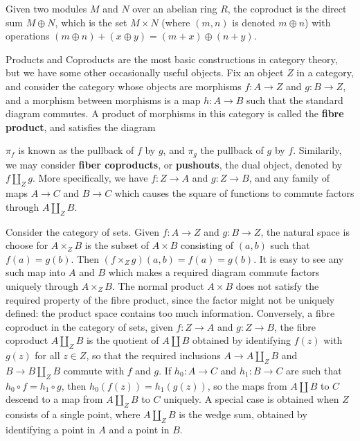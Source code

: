 \begin{example}
    Given two modules $M$ and $N$ over an abelian ring $R$, the coproduct is the direct sum $M \oplus N$, which is the set $M \times N$ (where $(m,n)$ is denoted $m \oplus n$) with operations $(m \oplus n) + (x \oplus y) = (m + x) \oplus (n + y)$.
\end{example}

Products and Coproducts are the most basic constructions in category theory, but we have some other occasionally useful objects. Fix an object $Z$ in a category, and consider the category whose objects are morphisms $f: A \to Z$ and $g: B \to Z$, and a morphism between morphisms is a map $h: A \to B$ such that the standard diagram commutes. A product of morphisms in this category is called the {\bf fibre product}, and satisfies the diagram
%
\begin{center}
\end{center}
%
$\pi_f$ is known as the pullback of $f$ by $g$, and $\pi_g$ the pullback of $g$ by $f$. Similarily, we may consider {\bf fiber coproducts}, or {\bf pushouts}, the dual object, denoted by $f \coprod_Z g$. More specifically, we have $f: Z \to A$ and $g: Z \to B$, and any family of maps $A \to C$ and $B \to C$ which causes the square of functions to commute factors through $A \coprod_Z B$.

\begin{example}
    Consider the category of sets. Given $f: A \to Z$ and $g: B \to Z$, the natural space is choose for $A \times_Z B$ is the subset of $A \times B$ consisting of $(a,b)$ such that $f(a) = g(b)$. Then $(f \times_Z g)(a,b) = f(a) = g(b)$. It is easy to see any such map into $A$ and $B$ which makes a required diagram commute factors uniquely through $A \times_Z B$. The normal product $A \times B$ does not satisfy the required property of the fibre product, since the factor might not be uniquely defined: the product space contains too much information. Conversely, a fibre coproduct in the category of sets, given $f: Z \to A$ and $g: Z \to B$, the fibre coproduct $A \coprod_Z B$ is the quotient of $A \coprod B$ obtained by identifying $f(z)$ with $g(z)$ for all $z \in Z$, so that the required inclusions $A \to A \coprod_Z B$ and $B \to B \coprod_Z B$ commute with $f$ and $g$. If $h_0: A \to C$ and $h_1: B \to C$ are such that $h_0 \circ f = h_1 \circ g$, then $h_0(f(z)) = h_1(g(z))$, so the maps from $A \coprod B$ to $C$ descend to a map from $A \coprod_Z B$ to $C$ uniquely. A special case is obtained when $Z$ consists of a single point, where $A \coprod_Z B$ is the wedge sum, obtained by identifying a point in $A$ and a point in $B$.
\end{example}


